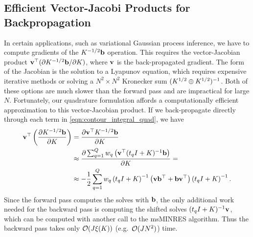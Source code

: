 \subsection{Efficient Vector-Jacobi Products for Backpropagation}

In certain applications, such as variational Gaussian process inference, we have to compute gradients of the $K^{-1/2} \mathbf{b}$ operation.
This requires the vector-Jacobian product $\mathbf{v}^\top ( \partial K^{-1/2} \mathbf{b} / \partial K)$, where $\mathbf{v}$ is the back-propagated gradient.
The form of the Jacobian is the solution to a Lyapunov equation, which requires expensive iterative methods or solving a $N^2 \times N^2$ Kronecker sum $(K^{1/2} \oplus K^{1/2})^{-1}$.
Both of these options are much slower than the forward pass and are impractical for large $N$.
%
Fortunately, our quadrature formulation affords a computationally efficient approximation to this vector-Jacobian product.
If we back-propagate directly through each term in \cref{eqn:contour_integral_quad}, we have
%
\begin{align}
  \mathbf{v}^\top \left( \frac{ \partial K^{-1/2} \mathbf{b} }{ \partial K } \right)
  &= \frac{ \partial \mathbf{v}^\top K^{-1/2} \mathbf{b} }{ \partial K }
  \nonumber
  \\
  &\approx \frac{ \partial \sum_{q=1}^{Q} w_q \left( \mathbf{v}^\top (t_q I + K)^{-1} \mathbf{b} \right) }{ \partial K } =
  \nonumber
  \\
  &\approx
  - \frac{1}{2} \sum_{q=1}^{Q} w_q \left( t_q I + K \right)^{-1} \left( \mathbf{v} \mathbf{b}^\top + \mathbf{b} \mathbf{v}^\top \right) \left( t_q I + K \right)^{-1}.
  \label{eqn:ciq_deriv}
\end{align}
%
Since the forward pass computes the solves with $\mathbf{b}$, the only additional work needed for the backward pass is computing the shifted solves $(t_q I + K)^{-1} \mathbf{v}$, which can be computed with another call to the msMINRES algorithm.
Thus the backward pass takes only $\bigo{J \mvm{\bK}}$ (e.g.~$\bigo{J N^2}$) time.




